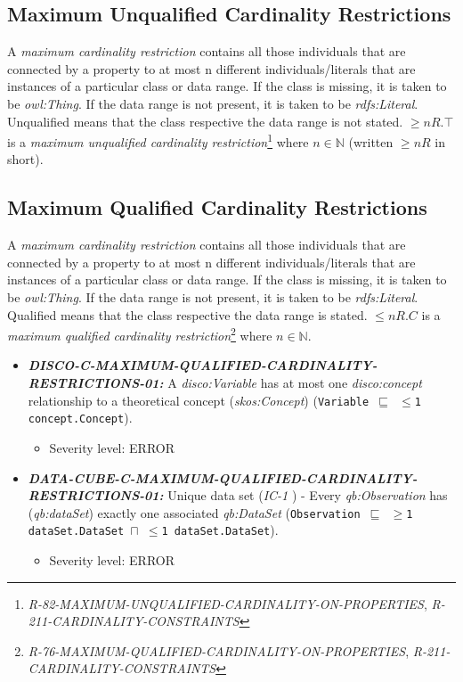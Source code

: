 \documentclass{llncs}
\newcommand{\ms}[1]{\texttt{#1}}
\begin{document}
\subsection{Maximum Unqualified Cardinality Restrictions}

A \emph{maximum cardinality restriction} contains all those individuals that are connected by a property to at most n different individuals/literals that are instances of a particular class or data range. If the class is missing, it is taken to be \emph{owl:Thing}. If the data range is not present, it is taken to be \emph{rdfs:Literal}.
Unqualified means that the class respective the data range is not stated. 
$\geq n R. \top$ is a \emph{maximum unqualified cardinality restriction}\footnote{\emph{R-82-MAXIMUM-UNQUALIFIED-CARDINALITY-ON-PROPERTIES}, \emph{R-211-CARDINALITY-CONSTRAINTS}} where $n \in \mathbb{N}$ (written $\geq  n R$ in short).

\subsection{Maximum Qualified Cardinality Restrictions}

A \emph{maximum cardinality restriction} contains all those individuals that are connected by a property to at most n different individuals/literals that are instances of a particular class or data range. If the class is missing, it is taken to be \emph{owl:Thing}. If the data range is not present, it is taken to be \emph{rdfs:Literal}.
Qualified means that the class respective the data range is stated. 
$\leq n R. C$ is a \emph{maximum qualified cardinality restriction}\footnote{\emph{R-76-MAXIMUM-QUALIFIED-CARDINALITY-ON-PROPERTIES}, \emph{R-211-CARDINALITY-CONSTRAINTS}} where $n \in \mathbb{N}$.

\begin{itemize}
	\item \textbf{{\em DISCO-C-MAXIMUM-QUALIFIED-CARDINALITY-RESTRICTIONS-01:}}
	A {\em disco:Variable} has at most one {\em disco:concept} relationship to a theoretical concept ({\em skos:Concept}) (\ms{Variable $\sqsubseteq$ $\leq$1 concept.Concept}).
	\begin{itemize}
		\item Severity level: ERROR
	\end{itemize}
	\item \textbf{{\em DATA-CUBE-C-MAXIMUM-QUALIFIED-CARDINALITY-RESTRICTIONS-01:}}
	Unique data set (\emph{IC-1} \cite{CyganiakReynolds2014}) -  
	Every \emph{qb:Observation} has (\emph{qb:dataSet}) exactly one associated \emph{qb:DataSet} (\ms{Observation $\sqsubseteq$ $\geq$1 dataSet.DataSet $\sqcap$ $\leq$1 dataSet.DataSet}). 
	\begin{itemize}
		\item Severity level: ERROR
	\end{itemize}
\end{itemize}
\end{document}
